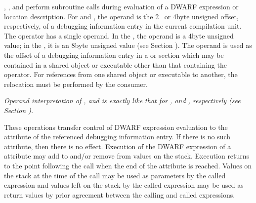 \begin{enumerate}[1. ]
, 
, 
and  perform
subroutine calls during evaluation of a DWARF expression or
location description. 
For  and , 
the operand is the 2\dash~ or 4\dash byte unsigned offset, respectively,
of a debugging information entry in the current compilation
unit. The  operator has a single operand. In the
\thirtytwobitdwarfformat,
the operand is a 4\dash byte unsigned value;
in the \sixtyfourbitdwarfformat, it is an 8\dash byte unsigned value
(see Section ). 
The operand is used as the offset of a
debugging information entry in a 
\dotdebuginfo{}
or
\dotdebugtypes{}
section which may be contained in a shared object or executable
other than that containing the operator. For references from
one shared object or executable to another, the relocation
must be performed by the consumer.  

\textit{Operand interpretation of
,  and  is exactly like
that for ,  and ,
respectively  
(see Section  ).  
}

These operations transfer
control of DWARF expression evaluation to 
the 
attribute of the referenced debugging information entry. If
there is no such attribute, then there is no effect. Execution
of the DWARF expression of 
a 
 attribute may add
to and/or remove from values on the stack. Execution returns
to the point following the call when the end of the attribute
is reached. Values on the stack at the time of the call may be
used as parameters by the called expression and values left on
the stack by the called expression may be used as return values
by prior agreement between the calling and called expressions.
\end{enumerate}

